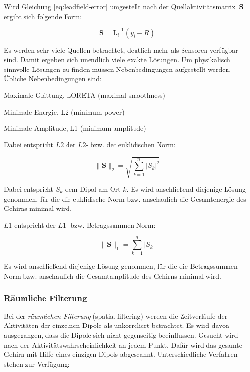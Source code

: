 \documentclass[doc,a4paper,12pt]{apa6}
\newcommand{\mx}[1]{\mathbf{#1}}
\begin{document}
Wird Gleichung \ref{eq:leadfield-error} umgestellt nach der Quellaktivitätsmatrix~$\mx{S}$ ergibt sich folgende Form:

\begin{equation}
\mx{S} = \mx{L}_i^{-1} ( y_i - R )
\end{equation}

Es werden sehr viele Quellen betrachtet, deutlich mehr als Sensoren verfügbar sind. Damit ergeben sich unendlich viele exakte Lösungen. Um physikalisch sinnvolle Lösungen zu finden müssen Nebenbedingungen aufgestellt werden. Übliche Nebenbedingungen sind:

\begin{compactitem}
\item Maximale Glättung, LORETA (maximal smoothness)
\item Minimale Energie, L2 (minimum power)
\item Minimale Amplitude, L1 (minimum amplitude)
\end{compactitem}

Dabei entspricht $L2$ der $L2$- bzw. der euklidischen Norm:

\begin{equation}
\|\mx{S}\|_2 = \sqrt{\sum_{k=1}^n |S_k|^2}
\end{equation}

Dabei entspricht $S_k$ dem Dipol am Ort $k$. Es wird anschließend diejenige Lösung genommen, für die die euklidische Norm bzw. anschaulich die Gesamtenergie des Gehirns minimal wird.

$L1$ entspricht der $L1$- bzw. Betragssummen-Norm:

\begin{equation}
\|\mx{S}\|_1 = \sum_{k=1}^n |S_k|
\end{equation}

Es wird anschließend diejenige Lösung genommen, für die die Betragssummen-Norm bzw. anschaulich die Gesamtamplitude des Gehirns minimal wird.

\subsubsection{Räumliche Filterung}
\label{sec:beam}

Bei der \emph{räumlichen Filterung} (spatial filtering) werden die Zeitverläufe der Aktivitäten der einzelnen Dipole als unkorreliert betrachtet. Es wird davon ausgegangen, dass die Dipole sich nicht gegenseitig beeinflussen. Gesucht wird nach der Aktivitätswahrscheinlichkeit an jedem Punkt. Dafür wird das gesamte Gehirn mit Hilfe eines einzigen Dipols abgescannt. Unterschiedliche Verfahren stehen zur Verfügung:
\end{document}
